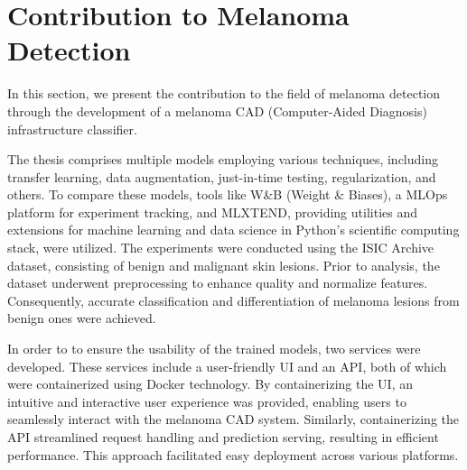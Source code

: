 \section{Contribution to Melanoma Detection}

In this section, we present the contribution to the field of melanoma detection
through the development of a melanoma CAD (Computer-Aided Diagnosis)
infrastructure classifier. \newline

The thesis comprises multiple models employing various techniques, including
transfer learning, data augmentation, just-in-time testing, regularization, and
others. To compare these models, tools like W\&B (Weight \& Biases), a MLOps
platform for experiment tracking, and MLXTEND, providing utilities and
extensions for machine learning and data science in Python's scientific
computing stack, were utilized. The experiments were conducted using the ISIC
Archive dataset, consisting of benign and malignant skin lesions. Prior to
analysis, the dataset underwent preprocessing to enhance quality and normalize
features. Consequently, accurate classification and differentiation of melanoma
lesions from benign ones were achieved. \newline

In order to to ensure the usability of the trained models,
two services were developed. These services include a user-friendly UI and an
API, both of which were containerized using Docker technology. By
containerizing the UI, an intuitive and interactive user experience was
provided, enabling users to seamlessly interact with the melanoma CAD system.
Similarly, containerizing the API streamlined request handling and prediction
serving, resulting in efficient performance. This approach facilitated easy
deployment across various platforms.
